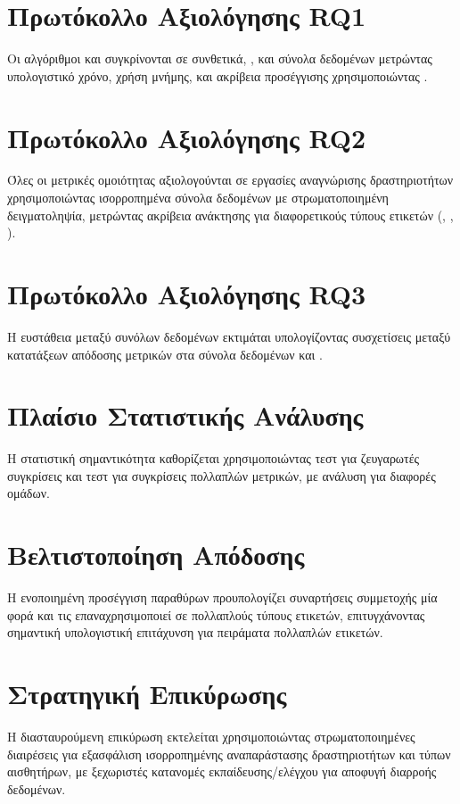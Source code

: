 \section{Πρωτόκολλο Αξιολόγησης RQ1}
Οι αλγόριθμοι  και  συγκρίνονται σε συνθετικά, , και  σύνολα δεδομένων μετρώντας υπολογιστικό χρόνο, χρήση μνήμης, και ακρίβεια προσέγγισης χρησιμοποιώντας .

\section{Πρωτόκολλο Αξιολόγησης RQ2}
Όλες οι μετρικές ομοιότητας αξιολογούνται σε εργασίες αναγνώρισης δραστηριοτήτων χρησιμοποιώντας ισορροπημένα σύνολα δεδομένων με στρωματοποιημένη δειγματοληψία, μετρώντας ακρίβεια ανάκτησης για διαφορετικούς τύπους ετικετών (, , ).

\section{Πρωτόκολλο Αξιολόγησης RQ3}
Η ευστάθεια μεταξύ συνόλων δεδομένων εκτιμάται υπολογίζοντας συσχετίσεις  μεταξύ κατατάξεων απόδοσης μετρικών στα σύνολα δεδομένων  και .

\section{Πλαίσιο Στατιστικής Ανάλυσης}
Η στατιστική σημαντικότητα καθορίζεται χρησιμοποιώντας τεστ  για ζευγαρωτές συγκρίσεις και τεστ  για συγκρίσεις πολλαπλών μετρικών, με ανάλυση  για διαφορές ομάδων.

\section{Βελτιστοποίηση Απόδοσης}
Η ενοποιημένη προσέγγιση παραθύρων προυπολογίζει συναρτήσεις συμμετοχής μία φορά και τις επαναχρησιμοποιεί σε πολλαπλούς τύπους ετικετών, επιτυγχάνοντας σημαντική υπολογιστική επιτάχυνση για πειράματα πολλαπλών ετικετών.

\section{Στρατηγική Επικύρωσης}
Η διασταυρούμενη επικύρωση εκτελείται χρησιμοποιώντας στρωματοποιημένες διαιρέσεις για εξασφάλιση ισορροπημένης αναπαράστασης δραστηριοτήτων και τύπων αισθητήρων, με ξεχωριστές κατανομές εκπαίδευσης/ελέγχου για αποφυγή διαρροής δεδομένων.

